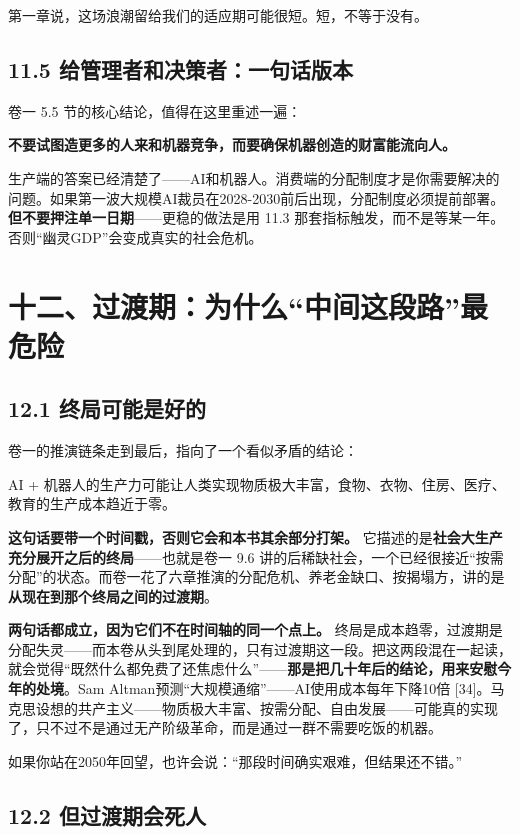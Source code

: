 \documentclass[11pt,a4paper]{ctexart}
\begin{document}
第一章说，这场浪潮留给我们的适应期可能很短。短，不等于没有。

\subsection{11.5 给管理者和决策者：一句话版本}

卷一 5.5 节的核心结论，值得在这里重述一遍：

\textbf{不要试图造更多的人来和机器竞争，而要确保机器创造的财富能流向人。}

生产端的答案已经清楚了——AI和机器人。消费端的分配制度才是你需要解决的问题。如果第一波大规模AI裁员在2028-2030前后出现，分配制度必须提前部署。\textbf{但不要押注单一日期}——更稳的做法是用 11.3 那套指标触发，而不是等某一年。否则“幽灵GDP”会变成真实的社会危机。

\section{十二、过渡期：为什么“中间这段路”最危险}

\subsection{12.1 终局可能是好的}

卷一的推演链条走到最后，指向了一个看似矛盾的结论：

AI + 机器人的生产力可能让人类实现物质极大丰富，食物、衣物、住房、医疗、教育的生产成本趋近于零。

\textbf{这句话要带一个时间戳，否则它会和本书其余部分打架。} 它描述的是\textbf{社会大生产充分展开之后的终局}——也就是卷一 9.6 讲的后稀缺社会，一个已经很接近“按需分配”的状态。而卷一花了六章推演的分配危机、养老金缺口、按揭塌方，讲的是\textbf{从现在到那个终局之间的过渡期}。

\textbf{两句话都成立，因为它们不在时间轴的同一个点上。} 终局是成本趋零，过渡期是分配失灵——而本卷从头到尾处理的，只有过渡期这一段。把这两段混在一起读，就会觉得“既然什么都免费了还焦虑什么”——\textbf{那是把几十年后的结论，用来安慰今年的处境}。Sam Altman预测“大规模通缩”——AI使用成本每年下降10倍 [34]。马克思设想的共产主义——物质极大丰富、按需分配、自由发展——可能真的实现了，只不过不是通过无产阶级革命，而是通过一群不需要吃饭的机器。

如果你站在2050年回望，也许会说：“那段时间确实艰难，但结果还不错。”

\subsection{12.2 但过渡期会死人}
\end{document}
